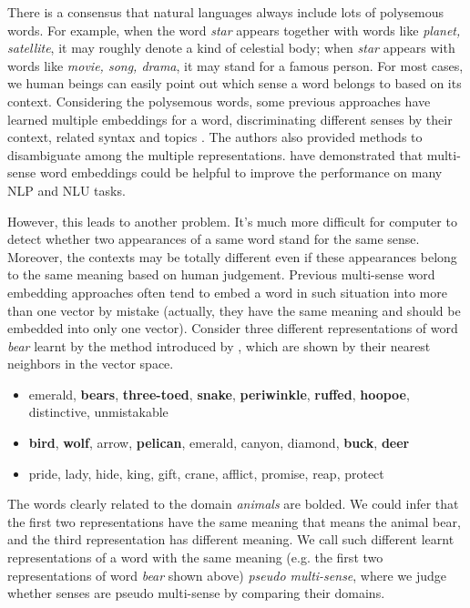 \documentclass[11pt]{article}
\begin{document}
\par
There is a consensus that natural languages always include lots of polysemous words. For example, when the word {\sl star} appears together with words like {\sl planet, satellite}, it may roughly denote a kind of celestial body; when {\sl star} appears with words like {\sl movie, song, drama}, it may stand for a famous person. For most cases, we human beings can easily point out which sense a word belongs to based on its context. Considering the polysemous words, some previous approaches have learned multiple embeddings for a word, discriminating different senses by their context, related syntax and topics \cite{reisinger2010multi, huang2012improving, chen2014unified, pina2014simple, neelakantan2015efficient, cheng2015syntax, liu2015topical}. The authors also provided methods to disambiguate among the multiple representations.  have demonstrated that multi-sense word embeddings could be helpful to improve the performance on many NLP and NLU tasks.
\par
However, this leads to another problem. It's much more difficult for computer to detect whether two appearances of a same word stand for the same sense. Moreover, the contexts may be totally different even if these appearances belong to the same meaning based on human judgement. Previous multi-sense word embedding approaches often tend to embed a word in such situation into more than one vector by mistake (actually, they have the same meaning and should be embedded into only one vector). Consider three different representations of word {\sl bear} learnt by the method introduced by , which are shown by their nearest neighbors in the vector space.
\begin{itemize}
\item emerald, \textbf{bears}, \textbf{three-toed}, \textbf{snake}, \textbf{periwinkle}, \textbf{ruffed}, \textbf{hoopoe}, distinctive, unmistakable
\item \textbf{bird}, \textbf{wolf}, arrow, \textbf{pelican}, emerald, canyon, diamond, \textbf{buck}, \textbf{deer}
\item pride, lady, hide, king, gift, crane, afflict, promise, reap, protect
\end{itemize}
The words clearly related to the domain {\sl animals} are bolded. We could infer that the first two representations have the same meaning that means the animal bear, and the third representation has different meaning. We call such different learnt representations of a word with the same meaning (e.g. the first two representations of word {\sl bear} shown above) {\sl pseudo multi-sense}, where we judge whether senses are pseudo multi-sense by comparing their domains.
\end{document}
